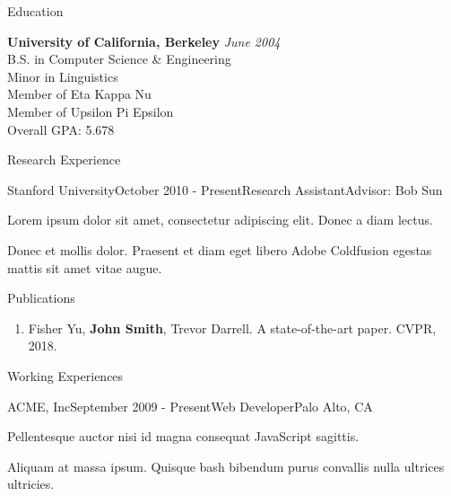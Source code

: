 \documentclass{resume} %
\begin{document}
\begin{rSection}{Education}

{\bf University of California, Berkeley} \hfill {\em June 2004} \\ 
B.S. in Computer Science \& Engineering \\
Minor in Linguistics \smallskip \\
Member of Eta Kappa Nu \\
Member of Upsilon Pi Epsilon \\
Overall GPA: 5.678

\end{rSection}


\begin{rSection}{Research Experience}

\begin{rSubsection}{Stanford University}{October 2010 - Present}{Research Assistant}{Advisor: Bob Sun}
\item Lorem ipsum dolor sit amet, consectetur adipiscing elit. Donec a diam lectus.
\item Donec et mollis dolor. Praesent et diam eget libero Adobe Coldfusion egestas mattis sit amet vitae augue.
\end{rSubsection}

\end{rSection}


\begin{rSection}{Publications}

\begin{enumerate}
\item Fisher Yu, \textbf{John Smith}, Trevor Darrell. A state-of-the-art paper. CVPR, 2018.
\end{enumerate}

\end{rSection}


\begin{rSection}{Working Experiences}

\begin{rSubsection}{ACME, Inc}{September 2009 - Present}{Web Developer}{Palo Alto, CA}
\item Pellentesque auctor nisi id magna consequat JavaScript sagittis.
\item Aliquam at massa ipsum. Quisque bash bibendum purus convallis nulla ultrices ultricies.
\end{rSubsection}

\end{rSection}
\end{document}
